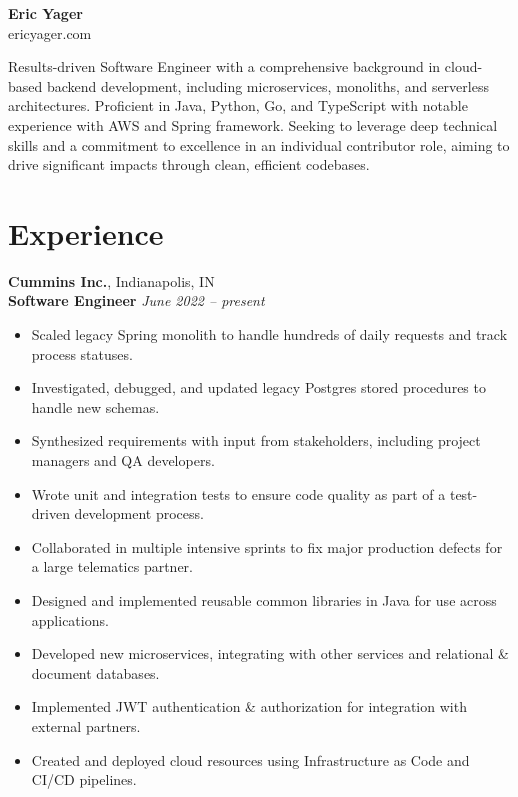 \documentclass[11pt,letterpaper]{article}
\begin{document}
\begin{center}
    {\huge\bfseries Eric Yager}\\
    {\large ericyager.com \textbar\ \myEmail\ \textbar\ \myPhoneNumber}
\end{center}

\noindent\hrulefill

\noindent Results-driven Software Engineer with a comprehensive background in cloud-based backend development,
including microservices, monoliths, and serverless architectures. Proficient in Java, Python, Go, and TypeScript
with notable experience with AWS and Spring framework. Seeking to leverage deep technical skills and a
commitment to excellence in an individual contributor role, aiming to drive significant impacts through clean,
efficient codebases.

\noindent\hrulefill

\section*{Experience}

\noindent\textbf{Cummins Inc.}, Indianapolis, IN\\
\noindent\textbf{Software Engineer} \hfill \textit{June 2022 -- present}
\begin{itemize}
    \item Scaled legacy Spring monolith to handle hundreds of daily requests and track process statuses.
    \item Investigated, debugged, and updated legacy Postgres stored procedures to handle new schemas.
    \item Synthesized requirements with input from stakeholders, including project managers and QA developers.
    \item Wrote unit and integration tests to ensure code quality as part of a test-driven development process.
    \item Collaborated in multiple intensive sprints to fix major production defects for a large telematics partner.
    \item Designed and implemented reusable common libraries in Java for use across applications.
    \item Developed new microservices, integrating with other services and relational \& document databases.
    \item Implemented JWT authentication \& authorization for integration with external partners.
    \item Created and deployed cloud resources using Infrastructure as Code and CI/CD pipelines.
\end{itemize}
\end{document}
